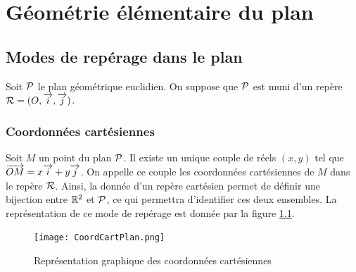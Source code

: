 \chapter{Géométrie élémentaire du plan}
\label{chap:geomplan}
\minitoc
\minilof
\minilot
\section{Modes de repérage dans le plan}
\label{sec:modederep}
Soit \(\P\) le plan géométrique euclidien. On suppose que \(\P\) est muni d'un repère \(\Rep=(O,\vi, \vj)\).
%
\subsection{Coordonnées cartésiennes}
\label{subsec:coordcart}
\begin{defdef}
  Soit \(M\) un point du plan \(\P\). Il existe un unique couple de réels \((x,y)\) tel que \(\vect{OM}=x\vi+y\vj\). On appelle ce couple les coordonnées cartésiennes de \(M\) dans le repère \(\Rep\). Ainsi, la donnée d'un repère cartésien permet de définir une bijection entre \(\R^2\) et \(\P\), ce qui permettra d'identifier ces deux ensembles. La représentation de ce mode de repérage est donnée par la figure \ref{fig:coordcart}.
\end{defdef}
\begin{figure}
  \centering
  \texttt{[image: CoordCartPlan.png]}
  \caption{Représentation graphique des coordonnées cartésiennes}
  \label{fig:coordcart}
\end{figure}
%
